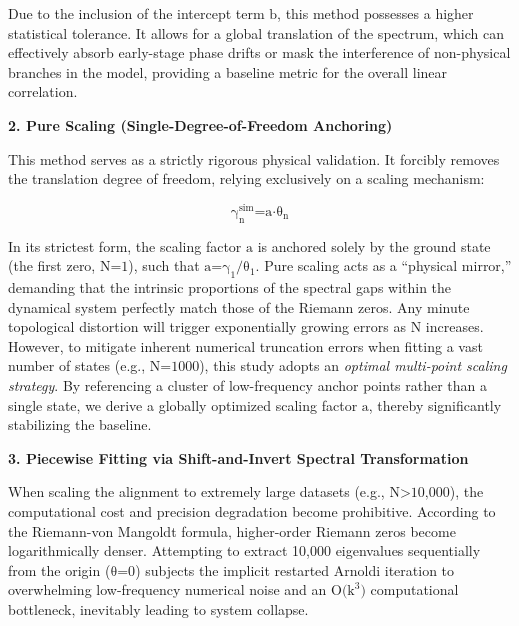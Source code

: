Due to the inclusion of the intercept term \(\text{b}\), this method
possesses a higher statistical tolerance. It allows for a global
translation of the spectrum, which can effectively absorb early-stage
phase drifts or mask the interference of non-physical branches in the
model, providing a baseline metric for the overall linear correlation.

\textbf{2. Pure Scaling (Single-Degree-of-Freedom Anchoring)}

This method serves as a strictly rigorous physical validation. It
forcibly removes the translation degree of freedom, relying exclusively
on a scaling mechanism:

\[\text{γ}_{\text{n}}^{\text{sim}}\text{=}\text{a}\text{⋅}\text{θ}_{\text{n}}\]

In its strictest form, the scaling factor \(\text{a}\) is anchored
solely by the ground state (the first zero, \(\text{N}\text{=1}\)), such
that \(\text{a}\text{=}\text{γ}_{\text{1}}\text{/}\text{θ}_{\text{1}}\).
Pure scaling acts as a ``physical mirror,'' demanding that the intrinsic
proportions of the spectral gaps within the dynamical system perfectly
match those of the Riemann zeros. Any minute topological distortion will
trigger exponentially growing errors as \(\text{N}\) increases. However,
to mitigate inherent numerical truncation errors when fitting a vast
number of states (e.g., \(\text{N}\text{=1000}\)), this study adopts an
\emph{optimal multi-point scaling strategy}. By referencing a cluster of
low-frequency anchor points rather than a single state, we derive a
globally optimized scaling factor \(\text{a}\), thereby significantly
stabilizing the baseline.

\textbf{3. Piecewise Fitting via Shift-and-Invert Spectral
Transformation}

When scaling the alignment to extremely large datasets (e.g.,
\(\text{N}\text{>10,000}\)), the computational cost and precision
degradation become prohibitive. According to the Riemann-von Mangoldt
formula, higher-order Riemann zeros become logarithmically denser.
Attempting to extract 10,000 eigenvalues sequentially from the origin
(\(\text{θ}\text{=0}\)) subjects the implicit restarted Arnoldi
iteration to overwhelming low-frequency numerical noise and an
\(\text{O}\text{(}\text{k}^{\text{3}}\text{)}\) computational
bottleneck, inevitably leading to system collapse.

